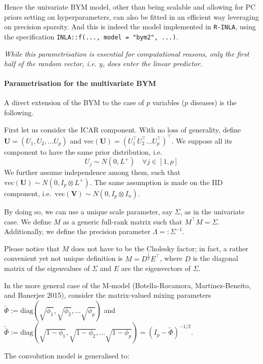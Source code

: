 \documentclass[
]{article}
\begin{document}
Hence the univariate BYM model, other than being scalable and allowing
for PC priors setting on hyperparameters, can also be fitted in an
efficient way leveraging on precision sparsity. And this is indeed the
model implemented in \texttt{R-INLA}, using the specification
\texttt{INLA::f(..., model = "bym2", ...)}.

\textit{While this parametrisation is essential for computational reasons, only the first half of the random vector, i.e. $y$, does enter the linear predictor.}

\paragraph{Parametrisation for the multivariate
BYM}\label{parametrisation-for-the-multivariate-bym}

A direct extension of the BYM to the case of \(p\) variables (\(p\)
diseases) is the following.

First let us consider the ICAR component. With no loss of generality,
define \(\mathbf{U} = (U_1, U_2, \dots U_p)\) and
\(\mathrm{vec}( \mathbf{U}) = (U_1^{\top} U_2^{\top} \dots U_p^{\top} )^{\top}\).
We suppose all its component to have the same prior distribution, i.e.~
\[U_j \sim N(0, L^{+}) \quad \forall j \in [1,p]\] We further assume
independence among them, such that
\(\mathrm{vec}(\mathbf{U}) \sim N(0, I_p \otimes L^{+})\). The same
assumption is made on the IID component,
i.e.~\(\mathrm{vec}(\mathbf{V}) \sim N(0, I_p \otimes I_n)\).

By doing so, we can use a unique scale parameter, say \(\Sigma\), as in
the univariate case. We define \(M\) as a generic full-rank matrix such
that \(M^{\top}M = \Sigma\). Additionally, we define the precision
parameter \(\Lambda =: \Sigma^{-1}\).

Please notice that \(M\) does not have to be the Cholesky factor; in
fact, a rather convenient yet not unique definition is
\(M = D^{\frac{1}{2}}E^{\top}\), where \(D\) is the diagonal matrix of
the eigenvalues of \(\Sigma\) and \(E\) are the eigenvectors of
\(\Sigma\).

In the more general case of the M-model (Botella-Rocamora,
Martinez-Beneito, and Banerjee 2015), consider the matrix-valued mixing
parameters
\(\tilde{\Phi}:=\mathrm{diag}(\sqrt{\phi_1},\sqrt{\phi_2}, \dots \sqrt{\phi_p})\)
and
\(\tilde{\bar{\Phi}}:= \mathrm{diag} (\sqrt{1 - \phi_1}, \sqrt{1 - \phi_2}, \dots \sqrt{1 - \phi_p}) = (I_p - \tilde{\Phi})^{-1/2}\).

The convolution model is generalised to:
\end{document}
